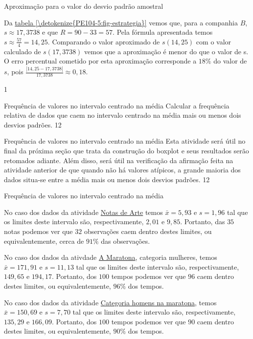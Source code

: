 {\begin{answer}{Aproximação para o valor do desvio padrão amostral}
{\begin{enumerate}
Da \hyperref[\detokenize{PE104-5:fig-estrategia}]{tabela \ref{\detokenize{PE104-5:fig-estrategia}}} vemos que, para a companhia $B$, $s\approx17{,}3738$ e que $R=90-33=57$. Pela fórmula apresentada temos $s\approx\frac{57}{4}=14{,}25$. Comparando o valor aproximado de $s(14{,}25)$ com o valor calculado de $s(17{,}3738)$ vemos que a aproximação é menor do que o valor de s. O erro percentual cometido por esta aproximação corresponde a $18\%$ do valor de $s$, pois $\frac{|14{,}25-17{,}3738|}{17{,}3738}\approx0{,}18$.
\end{enumerate}
}{1}
\end{answer}
\marginpar{\vspace{-1em}}
\begin{objectives}{Frequência de valores no intervalo centrado na média}
{
Calcular a frequência relativa de dados que caem no intervalo centrado na média mais ou menos dois desvios padrões.
}{1}{2}
\end{objectives}
\marginpar{\vspace{-2.5em}}
\begin{sugestions}{Frequência de valores no intervalo centrado na média}
{
Esta atividade será útil no final da próxima seção que trata da construção do boxplot e seus resultados serão retomados adiante. Além disso, será útil na verificação da afirmação feita na atividade anterior de que quando não há valores atípicos, a grande maioria dos dados situa-se entre a média mais ou menos dois desvios padrões.
}{1}{2}
\end{sugestions}
\marginpar{\vspace{-1em}}
\begin{answer}{Frequência de valores no intervalo centrado na média}
{
No caso dos dados da atividade \hyperref[\detokenize{PE104-0:ativ-notas-de-artes}]{Notas de Arte} temos $\bar{x}=5{,}93$ e $s=1{,}96$ tal que os limites deste intervalo são, respectivamente, $2{,}01$ e $9{,}85$. Portanto, das $35$ notas podemos ver que $32$ observações caem dentro destes limites, ou equivalentemente, cerca de $91\%$ das observações.

No caso dos dados da ativdade \hyperref[\detokenize{PE104-0:ativ-maratona-de-ny}]{A Maratona}, categoria mulheres, temos $\bar{x}=171{,}91$ e $s=11{,}13$ tal que os limites deste intervalo são, respectivamente, $149{,}65$ e $194{,}17$. Portanto, dos $100$ tempos podemos ver que $96$ caem dentro destes limites, ou equivalentemente, $96\%$ dos tempos.

No caso dos dados da atividade \hyperref[\detokenize{PE104-2:ativ-maratona-categoria-homens}]{Categoria  homens na maratona}, temos $\bar{x}=150{,}69$ e $s=7{,}70$ tal que os limites deste intervalo são, respectivamente, $135{,}29$ e $166{,}09$. Portanto, dos $100$ tempos podemos ver que $90$ caem dentro destes limites, ou equivalentemente, $90\%$ dos tempos.

}
\end{answer}}
